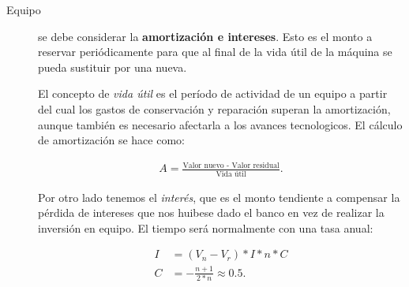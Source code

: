 \documentclass[../main.tex]{subfiles}
\begin{document}
\begin{description}
  \item[Equipo] se debe considerar la \textbf{amortización e intereses}. Esto es 
    el monto a reservar periódicamente para que al final de la vida útil de la 
    máquina se pueda sustituir por una nueva. 

    El concepto de \textit{vida útil} es el período de actividad de un equipo a 
    partir del cual los gastos de conservación y reparación superan la 
    amortización, aunque también es necesario afectarla a los avances tecnologicos.
    El cálculo de amortización se hace como:
    
    \begin{align*}
      A = \frac{\text{Valor nuevo - Valor residual}}{\text{Vida útil}} \tag{Amortización}
    .\end{align*}

    Por otro lado tenemos el \textit{interés}, que es el monto tendiente a compensar
    la pérdida de intereses que nos huibese dado el banco en vez de realizar la
    inversión en equipo. El tiempo será normalmente con una tasa anual:

    \begin{align*}
      I &= (V_n - V_r) * I * n * C \tag{Intereses} \\[5pt] 
      C &= - \frac{n+1}{2*n} \approx 0.5\tag{Coef. de Gabay}
    .\end{align*}
\end{description}
\end{document}
